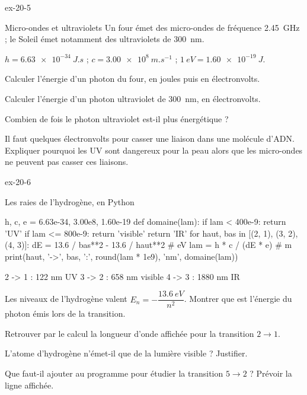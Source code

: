 \begin{blocLivre}{ex-20-5}
\begin{exercice}[1]{Micro-ondes et ultraviolets}
Un four émet des micro-ondes de fréquence \qty{2,45}{GHz} ; le Soleil émet notamment des ultraviolets de \qty{300}{nm}.
\begin{donnees}
$h=\qty{6,63e-34}{J.s}$ ; $c=\qty{3,00e8}{m.s^{-1}}$ ; $\qty{1}{eV}=\qty{1,60e-19}{J}$.
\end{donnees}
\begin{questions}
\item Calculer l'énergie d'un photon du four, en joules puis en électronvolts.
\item Calculer l'énergie d'un photon ultraviolet de \qty{300}{nm}, en électronvolts.
\item Combien de fois le photon ultraviolet est-il plus énergétique ?
\item Il faut quelques électronvolts pour casser une liaison dans une molécule d'ADN. Expliquer pourquoi les UV sont dangereux pour la peau
alors que les micro-ondes ne peuvent pas casser ces liaisons.
\end{questions}
\end{exercice}
\end{blocLivre}
\begin{blocLivre}{ex-20-6}
\begin{exercice}[2]{Les raies de l'hydrogène, en Python}
\begin{python}
h, c, e = 6.63e-34, 3.00e8, 1.60e-19
def domaine(lam):
    if lam < 400e-9:
        return 'UV'
    if lam <= 800e-9:
        return 'visible'
    return 'IR'
for haut, bas in [(2, 1), (3, 2), (4, 3)]:
    dE = 13.6 / bas**2 - 13.6 / haut**2       # eV
    lam = h * c / (dE * e)                    # m
    print(haut, '->', bas, ':', round(lam * 1e9), 'nm', domaine(lam))
\end{python}
\begin{console}
2 -> 1 : 122 nm UV
3 -> 2 : 658 nm visible
4 -> 3 : 1880 nm IR
\end{console}
\begin{questions}
\item {}Les niveaux de l'hydrogène valent $E_n=-\dfrac{\qty{13,6}{eV}}{n^2}$. Montrer que  est l'énergie du photon émis lors de la transition.
\item Retrouver par le calcul la longueur d'onde affichée pour la transition $2\to1$.
\item L'atome d'hydrogène n'émet-il que de la lumière visible ? Justifier.
\item Que faut-il ajouter au programme pour étudier la transition $5\to2$ ? Prévoir la ligne affichée.
\end{questions}
\end{exercice}
\end{blocLivre}
